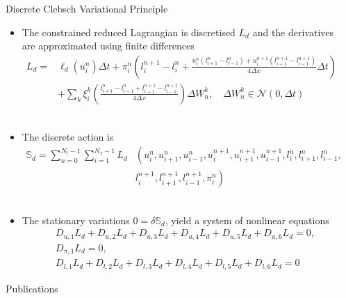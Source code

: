 \documentclass[xcolor={table}]{beamer}
\begin{document}
\begin{frame}[fragile=singleslide,t]
\begin{columns}[onlytextwidth,T]
\begin{column}{.31\textwidth}





\end{column}
\begin{column}{.31\textwidth}
\begin{block}{Discrete Clebsch Variational Principle}
\begin{itemize}
\item The constrained reduced Lagrangian is discretised $L_d $ and the derivatives are approximated using finite differences
\begin{align*}
L_d =&  \ell_d(u_i^n) \Delta t +  \pi_i^n \left( l_i^{n+1} - l_i^n  + \frac{u_i^n (l_{i+1}^n - l_{i-1}^n) + u_i^{n+1} (l_{i+1}^{n+1} - l_{i-1}^{n+1})}{4 \Delta x}  \Delta t  \right)  \\
&+ \sum_k \xi_i^k \left( \frac{l_{i+1}^n - l_{i-1}^n + l_{i+1}^{n+1} - l_{i-1}^{n+1}}{4 \Delta x} \right)  \Delta W_n^k, \quad  \Delta W_n^k \in \mathcal{N}(0, \Delta t)
\end{align*}
 \\
\item The discrete action is
\begin{align*}
\mathbb{S}_d = \sum\limits_{n=0}^{N_t-1}\sum\limits_{i=1}^{N_x-1} L_d & \left(  u_i^n, u_{i+1}^n, u_{i-1}^{n},  u_i^{n+1}, u_{i+1}^{n+1}, u_{i-1}^{n+1}, l_i^{n}, l_{i+1}^{n}, l_{i-1}^{n},  \right. \\
& \left. l_i^{n+1}, l_{i+1}^{n+1}, l_{i-1}^{n+1}, \pi_i^n  \right) 
\end{align*} \\
\item The stationary variations $0 = \delta \mathbb{S}_d$, yield a system of nonlinear equations
\begin{align*}
&D_{u,1} L_d + D_{u,2} L_d + D_{u,3} L_d + D_{u,4} L_d + D_{u,5} L_d + D_{u,6} L_d = 0, \\
&D_{\pi, 1} L_d = 0, \\
&D_{l,1} L_d + D_{l,2} L_d + D_{l,3} L_d + D_{l,4} L_d + D_{l,5} L_d + D_{l,6} L_d = 0 
\end{align*}
\end{itemize}
    \end{block}

\begin{block}{Publications}

{\small }
\end{block}

\end{column}
\end{columns}


\end{frame}
\end{document}
